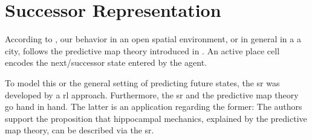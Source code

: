 \section{Successor Representation} \label{sec: SR}
According to , our behavior in an open spatial environment, or in general in a \cognitiveroom{} \eg a city, follows the predictive map theory introduced in . An active place cell encodes the next/successor state entered by the agent.

To model this or the general setting of predicting future states, the \gls{sr} was developed by a \gls{rl} approach. Furthermore, the \gls{sr} and the predictive map theory go hand in hand. The latter is an application regarding the former: The authors support the proposition that hippocampal mechanics, explained by the predictive map theory, can be described via the \gls{sr}.


